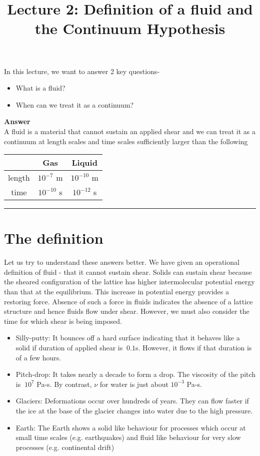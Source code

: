 \documentclass[11pt, letterpaper]{article}
\title{Lecture 2: Definition of a fluid and the Continuum Hypothesis}
\begin{document}
\maketitle
In this lecture, we want to answer 2 key questions-
\begin{itemize}
\item What is a fluid?
\item When can we treat it as a continuum?
\end{itemize}

\textbf{Answer}\\

A fluid is a material that cannot sustain an applied shear and we can treat it 
as a continuum at length scales and time scales sufficiently larger than the 
following 

\begin{center}
\begin{tabular}{ c|c|c| }
 & Gas & Liquid \\
\hline
 length & $10^{-7}$ m & $10^{-10}$ m \\  
 time & $10^{-10}$ s & $10^{-12}$ s   
\end{tabular}
\end{center}

\rule{\textwidth}{0.8pt}

\section{The definition}

Let us try to understand these answers better. We have given an operational definition of fluid - that it cannot sustain shear. Solids can sustain shear because the sheared configuration of the lattice has higher intermolecular potential energy than that at the equilibrium. This increase in potential energy provides a restoring force. Absence of such a force in fluids indicates the absence of a lattice structure and hence fluids flow under shear. However, we must also consider the time for which shear is being imposed. 
\begin{itemize}
\item Silly-putty: It bounces off a hard surface indicating that it behaves like a solid if duration of applied shear is $~0.1$s. However, it flows if that duration is of a few hours.

\item Pitch-drop: It takes nearly a decade to form a drop. The viscosity of the pitch is $~10^{7}$ Pa-s. By contrast, $\nu$ for water is just about $10^{-3}$ 
Pa-s.

\item Glaciers: Deformations occur over hundreds of years. They can flow faster if the ice at the base of the glacier changes into water due to the high 
pressure.

\item Earth: The Earth shows a solid like behaviour for processes which occur at small time scales (e.g. earthquakes) and fluid like behaviour for very slow processes (e.g. continental drift)
\end{itemize}
\end{document}

